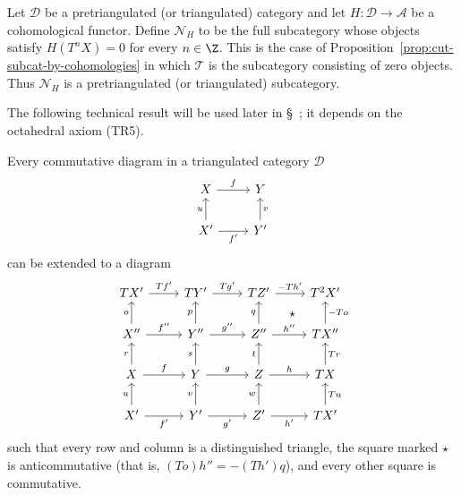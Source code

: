 \begin{example}\label{eg:subcat-N-H}
	Let $\mathcal{D}$ be a pretriangulated (or triangulated) category and let
	$H: \mathcal{D} \to \mathcal{A}$ be a cohomological functor. Define
	$\mathcal{N}_H$ to be the full subcategory whose objects satisfy
	$H(T^n X) = 0$ for every $n \in \Z$. This is the case of
	Proposition~\ref{prop:cut-subcat-by-cohomologies} in which $\mathcal{T}$
	is the subcategory consisting of zero objects. Thus $\mathcal{N}_H$ is a
	pretriangulated (or triangulated) subcategory.
\end{example}

The following technical result will be used later in
\S~; it depends on the
octahedral axiom (TR5).

\begin{lemma}[J.-L.\ Verdier]\label{prop:triangulated-9-diag}
	Every commutative diagram in a triangulated category $\mathcal{D}$
	\[\begin{tikzcd}
		X \arrow[r, "f"] & Y \\
		X' \arrow[r, "{f'}"'] \arrow[u, "u"] & Y' \arrow[u, "v"']
	\end{tikzcd}\]
	can be extended to a diagram
	\[\begin{tikzcd}
		TX' \arrow[r, "{Tf'}"] & TY' \arrow[r, "{Tg'}"] & TZ' \arrow[r, "{- Th'}"] & T^2 X' \arrow[phantom, ld, "\star" description] \\
		X'' \arrow[u, "o"] \arrow[r, "{f''}"] & Y'' \arrow[u, "p"] \arrow[r, "{g''}"] & Z'' \arrow[u, "q"] \arrow[r, "h''"] & TX'' \arrow[u, "{-To}"'] \\
		X \arrow[r, "f"] \arrow[u, "r"] & Y \arrow[r, "g"] \arrow[u, "s"] & Z \arrow[r, "h"] \arrow[u, "t"] & TX \arrow[u, "Tr"'] \\
		X' \arrow[r, "{f'}"'] \arrow[u, "u"] & Y' \arrow[r, "{g'}"'] \arrow[u, "v"] & Z' \arrow[r, "{h'}"'] \arrow[u, "w"] & TX' \arrow[u, "Tu"']
	\end{tikzcd}\]
	such that every row and column is a distinguished triangle, the square
	marked $\star$ is anticommutative (that is,
	$(To) h'' = -(Th') q$), and every other square is commutative.
\end{lemma}

